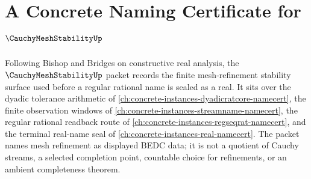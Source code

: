 \chapter{A Concrete Naming Certificate for $\CauchyMeshStabilityUp$}
\label{ch:concrete-instances-cauchy-mesh-stability-namecert}

Following Bishop and Bridges on constructive real analysis, the $\CauchyMeshStabilityUp$ packet records the finite mesh-refinement stability surface used before a regular rational name is sealed as a real. It sits over the dyadic tolerance arithmetic of \autoref{ch:concrete-instances-dyadicratcore-namecert}, the finite observation windows of \autoref{ch:concrete-instances-streamname-namecert}, the regular rational readback route of \autoref{ch:concrete-instances-regseqrat-namecert}, and the terminal real-name seal of \autoref{ch:concrete-instances-real-namecert}. The packet names mesh refinement as displayed BEDC data; it is not a quotient of Cauchy streams, a selected completion point, countable choice for refinements, or an ambient completeness theorem.


